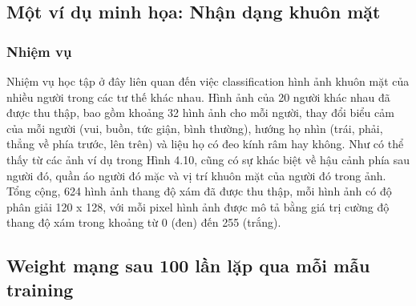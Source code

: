 \subsection{Một ví dụ minh họa: Nhận dạng khuôn mặt}

\subsubsection{Nhiệm vụ}

Nhiệm vụ học tập ở đây liên quan đến việc classification hình ảnh khuôn mặt của nhiều người trong các tư thế khác nhau. Hình ảnh của 20 người khác nhau đã được thu thập, bao gồm khoảng 32 hình ảnh cho mỗi người, thay đổi biểu cảm của mỗi người (vui, buồn, tức giận, bình thường), hướng họ nhìn (trái, phải, thẳng về phía trước, lên trên) và liệu họ có đeo kính râm hay không. Như có thể thấy từ các ảnh ví dụ trong Hình 4.10, cũng có sự khác biệt về hậu cảnh phía sau người đó, quần áo người đó mặc và vị trí khuôn mặt của người đó trong ảnh. Tổng cộng, 624 hình ảnh thang độ xám đã được thu thập, mỗi hình ảnh có độ phân giải 120 x 128, với mỗi pixel hình ảnh được mô tả bằng giá trị cường độ thang độ xám trong khoảng từ 0 (đen) đến 255 (trắng).

\subsection{Weight mạng sau 100 lần lặp qua mỗi mẫu training}

